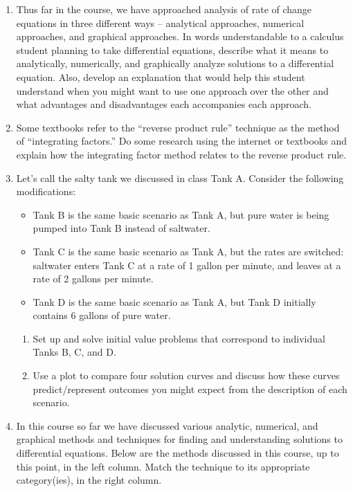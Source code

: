 \begin{enumerate}[resume]
\begin{enumerate}
\item	Thus far in the course, we have approached analysis of rate of change equations in three different ways -- analytical approaches, numerical approaches, and graphical approaches. In words understandable to a calculus student planning to take differential equations, describe what it means to analytically, numerically, and graphically analyze solutions to a differential equation. Also, develop an explanation that would help this student understand when you might want to use one approach over the other and what advantages and disadvantages each accompanies each approach. \label{06HWproblem7}

\item	Some textbooks refer to the ``reverse product rule'' technique as the method of ``integrating factors.'' Do some research using the internet or textbooks and explain how the integrating factor method relates to the reverse product rule. \label{06HWproblem8}

\item Let's call the salty tank we discussed in class Tank A. \label{06HWproblem9} Consider the following modifications:
\begin{itemize}
\item Tank B is the same basic scenario as Tank A, but pure water is being pumped into Tank B instead of saltwater.
\item Tank C is the same  basic scenario as Tank A, but the rates are switched: saltwater enters Tank C at a rate of 1 gallon per minute, and leaves at a rate of 2 gallons per minute.
\item Tank D is the same  basic scenario as Tank A, but Tank D initially contains 6 gallons of pure water.
\end{itemize}
\begin{enumerate}
\item Set up and solve initial value problems that correspond to individual Tanks B, C, and D.
\item Use a plot to compare four solution curves and discuss how these curves predict/represent outcomes you might expect from the description of each scenario. 
\end{enumerate}

\item In this course so far we have discussed various analytic, numerical, and graphical methods and techniques for finding and understanding solutions to differential equations. Below are the methods discussed in this course, up to this point, in the left column. Match the technique to its appropriate category(ies), in the right column. \label{06HWproblem10}


\end{enumerate}
\end{enumerate}

